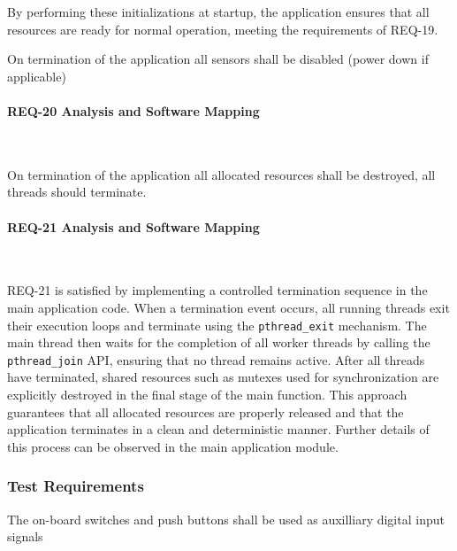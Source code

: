 By performing these initializations at startup, the application ensures that all 
resources are ready for normal operation, meeting the requirements of REQ-19.

\begin{tcolorbox}[
    title=REQ-20,
    colback=gray!5,
    colframe=black,
    fonttitle=\bfseries
]
On termination of the application all sensors shall be disabled (power down if applicable)
\end{tcolorbox}

\paragraph{REQ-20 Analysis and Software Mapping}\


\begin{tcolorbox}[
    title=REQ-21,
    colback=gray!5,
    colframe=black,
    fonttitle=\bfseries
]
On termination of the application all allocated resources shall be destroyed, all 
threads should terminate.
\end{tcolorbox}

\paragraph{REQ-21 Analysis and Software Mapping}\

REQ-21 is satisfied by implementing a controlled termination sequence in the main 
application code. When a termination event occurs, all running threads exit their 
execution loops and terminate using the \texttt{pthread\_exit} mechanism. The main thread then 
waits for the completion of all worker threads by calling the \texttt{pthread\_join} API, 
ensuring that no thread remains active. After all threads have terminated, shared 
resources such as mutexes used for synchronization are explicitly destroyed in the 
final stage of the main function. This approach guarantees that all allocated resources 
are properly released and that the application terminates in a clean and deterministic 
manner. Further details of this process can be observed in the main application module.

\subsubsection{Test Requirements}


\begin{tcolorbox}[
    title=REQ-25,
    colback=gray!5,
    colframe=black,
    fonttitle=\bfseries
]
The on-board switches and push buttons shall be used as auxilliary digital input signals
\end{tcolorbox}

